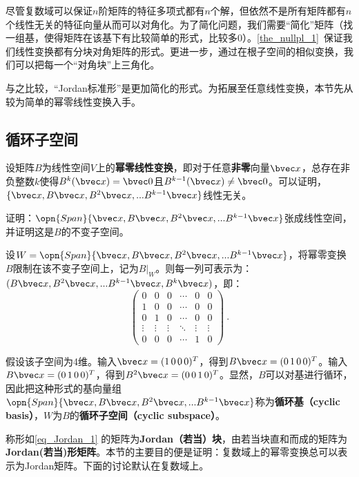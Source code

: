 

尽管复数域可以保证$n$阶矩阵的特征多项式都有$n$个解，但依然不是所有矩阵都有$n$个线性无关的特征向量从而可以对角化。为了简化问题，我们需要“简化”矩阵（找一组基，使得矩阵在该基下有比较简单的形式，比较多$0$）。\autoref{the_nullpl_1}~保证我们线性变换都有分块对角矩阵的形式。更进一步，通过在根子空间的相似变换，我们可以把每一个“对角块”上三角化。

与之比较，“Jordan标准形”是更加简化的形式。为拓展至任意线性变换，本节先从较为简单的幂零线性变换入手。
\subsection{循环子空间}
设矩阵$B$为线性空间$V$上的\textbf{幂零线性变换}，即对于任意\textbf{非零}向量$\bvec x$，总存在非负整数$k$使得$B^{k}(\bvec x)=\bvec 0$且$B^{k-1}(\bvec x)\neq \bvec 0$。可以证明，$\{\bvec x,B\bvec x,B^2\bvec x,...B^{k-1}\bvec x\}$线性无关。
\begin{exercise}{}
证明：$\opn{Span}\{\bvec x,B\bvec x,B^2\bvec x,...B^{k-1}\bvec x\}$张成线性空间，并证明这是$B$的不变子空间。
\end{exercise}
设$W=\opn{Span}\{\bvec x,B\bvec x,B^2\bvec x,...B^{k-1}\bvec x\}$，将幂零变换$B$限制在该不变子空间上，记为$B|_W$。则每一列可表示为：$(B\bvec x,B^2\bvec x,...B^{k-1}\bvec x,B^k\bvec x)$，即：
\begin{equation}\label{eq_Jordan_1}
\left(\begin{array}{cccccc}
0 & 0 & 0 & \cdots & 0 & 0 \\
1 & 0 & 0 & \cdots & 0 & 0 \\
0 & 1 & 0 & \cdots & 0 & 0 \\
\vdots & \vdots & \vdots & \ddots & \vdots & \vdots \\
0 & 0 & 0 & \cdots & 1 & 0
\end{array}\right)~.
\end{equation}

假设该子空间为4维。输入$\bvec x=(1\,0\,0\,0)^T$，得到$B\bvec x=(0\,1\,0\,0)^T$。输入$B\bvec x=(0\,1\,0\,0)^T$，得到$B^2\bvec x=(0\,0\,1\,0)^T$。显然，$B$可以对基进行循环，因此把这种形式的基向量组$\opn{Span}\{\bvec x,B\bvec x,B^2\bvec x,...B^{k-1}\bvec x\}$称为\textbf{循环基（cyclic basis）}，$W$为$B$的\textbf{循环子空间（cyclic subspace）}。

称形如\autoref{eq_Jordan_1} 的矩阵为\textbf{Jordan（若当）块}，由若当块直和而成的矩阵为\textbf{ Jordan(若当)形矩阵}。本节的主要目的便是证明：复数域上的幂零变换总可以表示为Jordan矩阵。下面的讨论默认在复数域上。


